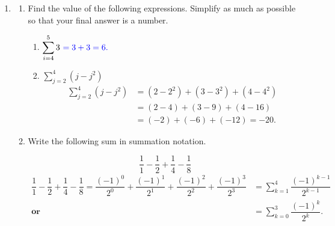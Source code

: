 \documentclass[11pt]{article}
\begin{document}
\begin{enumerate}
\newpage


\item 

\begin{enumerate}
    \item Find the value of the following expressions. Simplify as much as possible so that your final answer is a number.

    \begin{enumerate}
        \item[(i)] $\displaystyle\sum_{i=4}^5 3\
        {\color{blue}= 3 + 3 = 6.}$

        \vfill

        \item[(ii)] $\displaystyle\sum_{j=2}^4(j-j^2)$
        {\color{blue}\begin{align*}
        \displaystyle\sum_{j=2}^4(j-j^2) &= (2-2^2) + (3-3^2) + (4-4^2) \\
        &= (2-4) + (3-9) + (4-16) \\
        &=
        (-2) + (-6) + (-12) = -20.
        \end{align*}}

        \vfill
    \end{enumerate}

    \item Write the following sum in summation notation. 

    \[\dfrac{1}{1}-\dfrac{1}{2}+\dfrac{1}{4}-\dfrac{1}{8}\]
    {\color{blue}\begin{align*}
        \dfrac{1}{1}-\dfrac{1}{2}+\dfrac{1}{4}-\dfrac{1}{8} =
        \dfrac{(-1)^0}{2^0}+\dfrac{(-1)^1}{2^1}+\dfrac{(-1)^2}{2^2}+\dfrac{(-1)^3}{2^3} &=
        \displaystyle\sum_{k=1}^4 \dfrac{(-1)^{k-1}}{2^{k-1}} \\
        \textbf{or}\quad
        &=
        \displaystyle\sum_{k=0}^3 \dfrac{(-1)^k}{2^k}.
        \end{align*}}
    \vfill
\end{enumerate}


\newpage




\end{enumerate}
\end{document}
